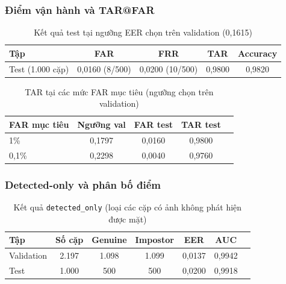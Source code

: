 \documentclass[12pt,a4paper]{article}
\begin{document}
\subsubsection{Điểm vận hành và TAR@FAR}
\begin{table}[H]
  \centering
  \caption{Kết quả test tại ngưỡng EER chọn trên validation (0,1615)}
  \label{tab:lfw-eer-threshold}
  \small
  \begin{tabular}{@{}lcccc@{}}
    \toprule
    \textbf{Tập} & \textbf{FAR} & \textbf{FRR} & \textbf{TAR} & \textbf{Accuracy}\\
    \midrule
    Test (1.000 cặp) & 0,0160 (8/500) & 0,0200 (10/500) & 0,9800 & 0,9820\\
    \bottomrule
  \end{tabular}
\end{table}

\begin{table}[H]
  \centering
  \caption{TAR tại các mức FAR mục tiêu (ngưỡng chọn trên validation)}
  \label{tab:lfw-tar-far}
  \small
  \begin{tabular}{@{}lcccc@{}}
    \toprule
    \textbf{FAR mục tiêu} & \textbf{Ngưỡng val} & \textbf{FAR test} & \textbf{TAR test}\\
    \midrule
    1\% & 0,1797 & 0,0160 & 0,9800\\
    0,1\% & 0,2298 & 0,0040 & 0,9760\\
    \bottomrule
  \end{tabular}
\end{table}

\subsubsection{Detected-only và phân bố điểm}
\begin{table}[H]
  \centering
  \caption{Kết quả \texttt{detected\_only} (loại các cặp có ảnh không phát hiện được mặt)}
  \label{tab:lfw-detected}
  \small
  \begin{tabular}{@{}lcccccc@{}}
    \toprule
    \textbf{Tập} & \textbf{Số cặp} & \textbf{Genuine} & \textbf{Impostor} & \textbf{EER} & \textbf{AUC}\\
    \midrule
    Validation & 2.197 & 1.098 & 1.099 & 0,0137 & 0,9942\\
    Test & 1.000 & 500 & 500 & 0,0200 & 0,9918\\
    \bottomrule
  \end{tabular}
\end{table}
\end{document}
